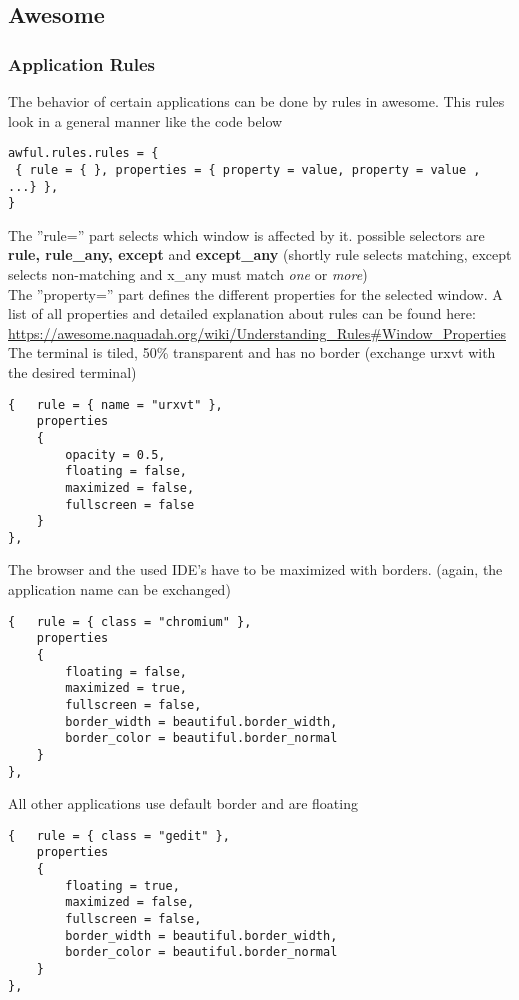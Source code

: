 		\subsection{Awesome}
    			\subsubsection{Application Rules}%
    				The behavior of certain applications can be done by rules in awesome. This rules look in a general manner like the code below
    				\begin{lstlisting}[caption={example ruling}]
awful.rules.rules = {
 { rule = { }, properties = { property = value, property = value , ...} },
}
    				\end{lstlisting}
    				
    				The ''rule={}'' part selects which window is affected by it. possible selectors are \textbf{rule, rule\_any, except} and \textbf{except\_any} (shortly rule selects matching, except selects non-matching and x\_any must match \textit{one} or \textit{more})\\
    				The ''property={}'' part defines the different properties for the selected window. A list of all properties and detailed explanation about rules can be found here: 
    				\url{https://awesome.naquadah.org/wiki/Understanding_Rules#Window_Properties}\\
    				
\noindent  The terminal is tiled, 50\% transparent and has no border (exchange urxvt with the desired terminal)
				\begin{lstlisting}[caption={ruling for terminals}]
{ 	rule = { name = "urxvt" }, 
	properties 
	{
		opacity = 0.5, 
		floating = false, 
		maximized = false, 
		fullscreen = false 
	}
},
				\end{lstlisting}
				
				The browser and the used IDE's have to be maximized with borders. (again, the application name can be exchanged)
				\begin{lstlisting}[caption={ruling for IDE and browser}]
{ 	rule = { class = "chromium" }, 
	properties 
	{ 
		floating = false,
		maximized = true, 
		fullscreen = false,
		border_width = beautiful.border_width,
		border_color = beautiful.border_normal 
	} 
},
				\end{lstlisting}
				
				All other applications use default border and are floating
				\begin{lstlisting}[caption={ruling for default applications}]
{ 	rule = { class = "gedit" }, 
	properties 
	{ 
		floating = true,
		maximized = false, 
		fullscreen = false,
		border_width = beautiful.border_width,
		border_color = beautiful.border_normal 
	} 
},
				\end{lstlisting}
				
